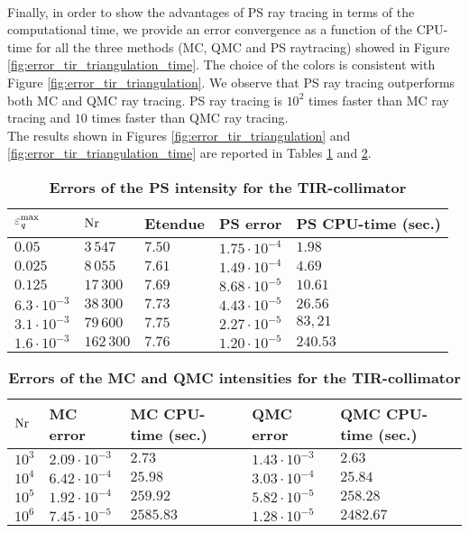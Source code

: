 \\ \indent Finally, in order to show the advantages of PS ray tracing in terms of the computational time, we provide an error convergence as a function of the CPU-time for all the three methods (MC, QMC and PS raytracing) showed in Figure \ref{fig:error_tir_triangulation_time}. The choice of the colors is consistent with Figure \ref{fig:error_tir_triangulation}. We observe that PS ray tracing outperforms both MC and QMC ray tracing. PS ray tracing is $10^2$ times faster than MC ray tracing and $10$ times faster than QMC ray tracing. \\ \indent The results shown in Figures \ref{fig:error_tir_triangulation} and \ref{fig:error_tir_triangulation_time} are reported in Tables \ref{tab:ps_error_triangulation} and \ref{tab:mc_error_triangulation}. \\ \indent
\begin{table}[t] 
\centering
\caption{\bf Errors of the PS intensity for the TIR-collimator}
\begin{tabular}{lllll}
 \hline   $\varepsilon_{\textit{q}}^{\textrm{max}} $  & $\textrm{Nr}$ & Etendue & PS error & PS CPU-time (sec.) \\
  \hline 
 $0.05$ & $3\,547$   & $7.50$   &  $1.75\cdot10^{-4}$ & $1.98$\\
$0.025$  & $8\,055$    & $7.61$    & $1.49\cdot 10^{-4}$ & $4.69$ \\
$0.125$  & $17\,300$    & $7.69$  & $8.68\cdot 10^{-5}$ & $10.61$\\
 $6.3 \cdot 10^{-3}$  & $38\,300$  & $7.73$   & $4.43\cdot 10^{-5}$ & $26.56$\\
 $3.1 \cdot 10^{-3}$ & $79\,600$  & $7.75$    & $2.27\cdot 10^{-5}$ & $83,21$\\
$1.6 \cdot 10^{-3}$ & $162\,300$  & $7.76$    & $1.20\cdot 10^{-5}$ & $240.53$\\
 \hline
 \end{tabular}
\label{tab:ps_error_triangulation}
 \end{table}
\begin{table}[t] \label{tab:table_tir_triangulation}
\centering
\caption{\bf Errors of the MC and QMC intensities for the TIR-collimator}
\begin{tabular}{lllll}
 \hline   $\textrm{Nr}$ & MC error & MC CPU-time (sec.) & QMC error  & QMC CPU-time (sec.)\\
  \hline 
 $10^3$     & $2.09\cdot 10^{-3}$ & $2.73$ & $1.43\cdot10^{-3}$    & $2.63$\\
 $10^4$     & $6.42\cdot 10^{-4}$ & $25.98$ & $3.03\cdot 10^{-4}$   & $25.84$\\
 $10^5$     & $1.92\cdot 10^{-4}$ & $259.92$ & $5.82\cdot 10^{-5}$   & $258.28$\\
 $10^6$     & $7.45\cdot 10^{-5}$ & $2585.83$   & $1.28\cdot 10^{-5}$   & $2482.67$\\
 \hline
 \end{tabular}
 \label{tab:mc_error_triangulation}
 \end{table}
